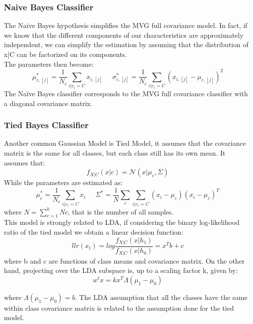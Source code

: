\documentclass{article}
\begin{document}
\subsubsection{Naive Bayes Classifier}
The Naive Bayes hypothesis simplifies the MVG full covariance model. In fact, if we know that the different components of our characteristics are approximately independent, we can simplify the estimation by assuming that the distribution of x|C can be factorized on its components.\\
The parameters then become:
\begin{equation}
    \mu_{c,[j]}^* = \frac{1}{N_c} \sum_{i|c_i=C} x_{i,[j]} \;\;\;\;\; \sigma_{c,[j]}^* = \frac{1}{N_c} \sum_{i|c_i=C} (x_{i,[j]} - \mu_{c,[j]})^2
\end{equation}
The Naïve Bayes classifier corresponds to the MVG full covariance classifier with a diagonal covariance matrix.
\subsubsection{Tied Bayes Classifier}
Another common Gaussian Model is Tied Model, it assumes that the covariance matrix is the same for all classes, but each class still has its own mean.
It assumes that:
\begin{equation}
    f_{X|C}(x|c) = \mathcal{N}(x|\mu_c,\Sigma)
\end{equation}
While the parameters are estimated as:
\begin{equation}
    \mu_c^* = \frac{1}{N_c} \sum_{i|c_i=C} x_{i} \;\;\;\;\; \Sigma^* = \frac{1}{N} \sum_{c} \sum_{i|c_i=C} (x_{i} - \mu_c)(x_{i} - \mu_c)^T
\end{equation}
where \(N= \sum_{c=1}^{k}Nc\), that is the number of all samples.\\
This model is strongly related to LDA, if considering the binary log-likelihood ratio of the tied model we obtain a linear decision function:
\begin{equation}
    llr(x_t) = log \frac{f_{X|C}(x|h_1)}{f_{X|C}(x|h_0)}= x^Tb+c
\end{equation}
where b and c are functions of class means and covariance matrix. On the other hand, projecting
over the LDA subspace is, up to a scaling factor k, given by:
\begin{equation}
   w^tx=k x^T \Lambda (\mu_1-\mu_0)
\end{equation}

where \( \Lambda(\mu_1-\mu_0)=b\). The LDA assumption that all the classes have the same within class covariance matrix is related to the assumption done for the tied model.
\end{document}
